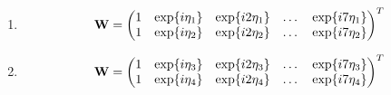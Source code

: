 \begin{enumerate}[label=\textbf{Шаг \arabic*:}]
    \item 
    \begin{equation}
        \vec W = 
        \begin{pmatrix}
            \mqty{
                1 & \exp{i\eta_1} & \exp{i2\eta_1} & \dots &\exp{i7\eta_1}\\
                1 & \exp{i\eta_2} & \exp{i2\eta_2} & \dots &\exp{i7\eta_2}\\
            }
        \end{pmatrix}^T
    \end{equation}
    \item 
    \begin{equation}
        \vec W = 
        \begin{pmatrix}
            \mqty{
                1 & \exp{i\eta_3} & \exp{i2\eta_3} & \dots &\exp{i7\eta_3}\\
                1 & \exp{i\eta_4} & \exp{i2\eta_4} & \dots &\exp{i7\eta_4}\\
            }
        \end{pmatrix}^T
    \end{equation}
\end{enumerate}

